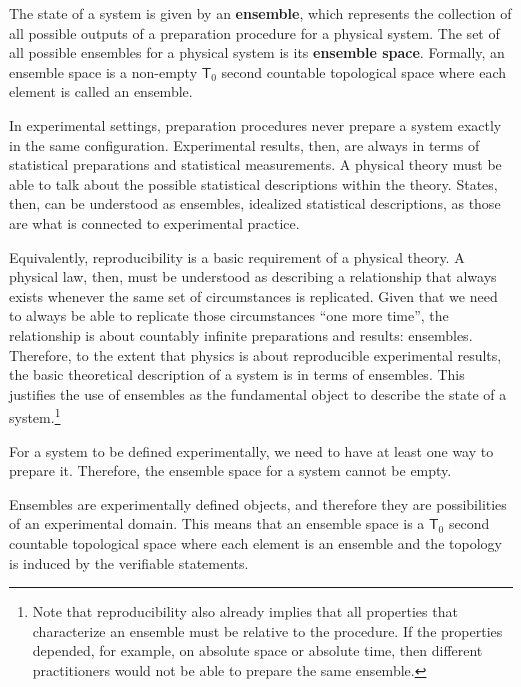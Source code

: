 \begin{mathSection}\label{pm-es-axiomEnsemble}
	\begin{axiom} 
		The state of a system is given by an \textbf{ensemble}, which represents the collection of all possible outputs of a preparation procedure for a physical system. The set of all possible ensembles for a physical system is its \textbf{ensemble space}. Formally, an ensemble space is a non-empty $\mathsf{T}_0$ second countable topological space where each element is called an ensemble.
	\end{axiom}
	
	\begin{justification}
		In experimental settings, preparation procedures never prepare a system exactly in the same configuration. Experimental results, then, are always in terms of statistical preparations and statistical measurements. A physical theory must be able to talk about the possible statistical descriptions within the theory. States, then, can be understood as ensembles, idealized statistical descriptions, as those are what is connected to experimental practice.
		
		Equivalently, reproducibility is a basic requirement of a physical theory. A physical law, then, must be understood as describing a relationship that always exists whenever the same set of circumstances is replicated. Given that we need to always be able to replicate those circumstances ``one more time'', the relationship is about countably infinite preparations and results: ensembles. Therefore, to the extent that physics is about reproducible experimental results, the basic theoretical description of a system is in terms of ensembles. This justifies the use of ensembles as the fundamental object to describe the state of a system.\footnote{Note that reproducibility also already implies that all properties that characterize an ensemble must be relative to the procedure. If the properties depended, for example, on absolute space or absolute time, then different practitioners would not be able to prepare the same ensemble.}
		
		For a system to be defined experimentally, we need to have at least one way to prepare it. Therefore, the ensemble space for a system cannot be empty.
		
		Ensembles are experimentally defined objects, and therefore they are possibilities of an experimental domain. This means that an ensemble space is a $\mathsf{T}_0$ second countable topological space where each element is an ensemble and the topology is induced by the verifiable statements.
	\end{justification}
\end{mathSection}

